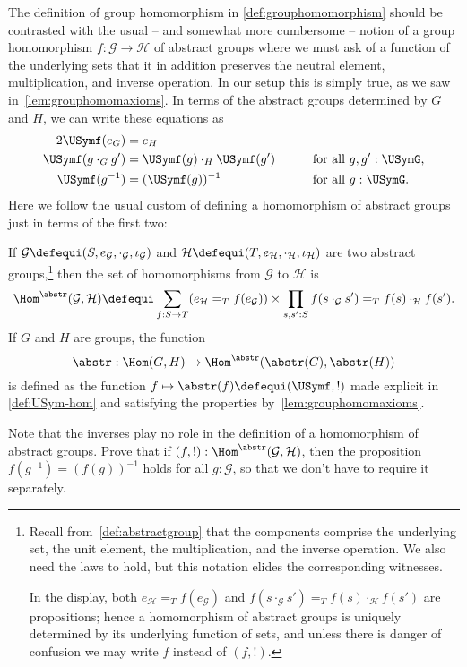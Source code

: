 The definition of group homomorphism in \cref{def:grouphomomorphism} should be contrasted with the usual -- and somewhat more cumbersome -- notion of a group homomorphism $f\colon \mathcal G\to \mathcal H$ of abstract groups where we must ask of a function of the underlying sets that it in addition preserves the neutral element,
multiplication, and inverse operation.
In our setup this is simply true, as we saw in~\cref{lem:grouphomomaxioms}.
In terms of the abstract groups determined by $G$ and $H$, we can write these equations
as
\begin{alignat*}2
  \USymf ( e_G )
  &= e_H
  &\qquad& \\
  \USymf (g \cdot_G g') &= \USymf(g) \cdot_H \USymf(g')
  && \text{for all $g, g' : \USymG$,} \\
  \USymf (g ^ {-1})
  &= (\USymf (g))^{-1}
  && \text{for all $g : \USymG$.}
\end{alignat*}
Here we follow the usual custom of defining a homomorphism of abstract groups
just in terms of the first two:
\begin{definition}\label{def:abstrisfunctor}
  If $\mathcal G\defequi(S,e_{\mathcal G},\cdot_{\mathcal G},\iota_{\mathcal G})$
  and $\mathcal H\defequi(T,e_{\mathcal H},\cdot_{\mathcal H},\iota_{\mathcal H})$
  are two abstract groups,\footnote{%
    Recall from~\cref{def:abstractgroup} that the components comprise
    the underlying set, the unit element, the multiplication,
    and the inverse operation.
    We also need the laws to hold, but this notation elides the corresponding witnesses.

    In the display, both $e_{\mathcal H}=_T f(e_{\mathcal G})$ and
    $f(s\cdot_{\mathcal G}s')=_Tf(s)\cdot_{\mathcal H}f(s')$ are
    propositions; hence a homomorphism of abstract groups is uniquely determined
    by its underlying function of sets, and unless there is danger of
    confusion we may write $f$ instead of $(f,!)$.}
  then the set of homomorphisms from $\mathcal G$ to $\mathcal H$ is
  \[
    \Hom^\abstr(\mathcal G,\mathcal H)
    \defequi\sum_{f:S\to T}(e_{\mathcal H}=_Tf(e_{\mathcal G}))\times
    \prod_{s,s':S}f(s\cdot_{\mathcal G}s')=_Tf(s)\cdot_{\mathcal H}f(s').
  \]
  If $G$ and $H$ are groups, the function
  \[
    \abstr:\Hom(G,H)\to\Hom^\abstr(\abstr(G),\abstr(H))
  \]
  is defined as the function $f\mapsto \abstr(f)\defequi(\USymf,!)$
  made explicit in \cref{def:USym-hom} and satisfying the
  properties by~\cref{lem:grouphomomaxioms}.
\end{definition}
\begin{xca}
  Note that the inverses play no role in the definition of a homomorphism of abstract groups.  Prove that if $(f,!):\Hom^\abstr(\mathcal G,\mathcal H)$,
  then the proposition $f(g^{-1})=(f(g))^{-1}$ holds for all $g:\mathcal G$,
  so that we don't have to require it separately.
\end{xca}
